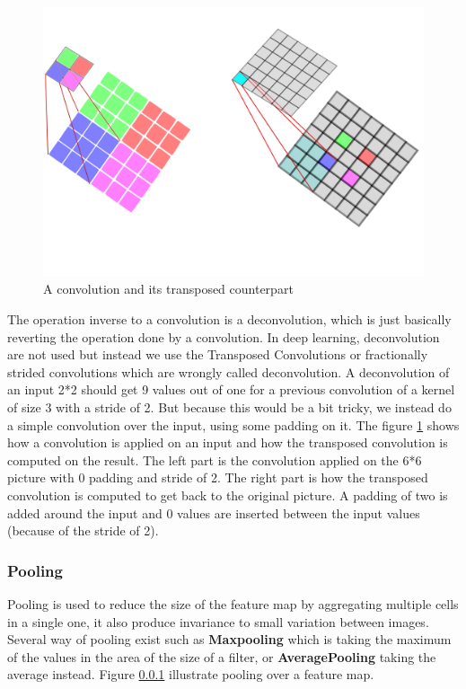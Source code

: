 \begin{figure}[ht!]
   \centerline{\includegraphics[scale=0.30]{./pics/convolution.png}}
   \caption{A convolution and its transposed counterpart}
   \label{fig:conv}
\end{figure}


The operation inverse to a convolution is a deconvolution, which is just basically reverting the operation done by a convolution.
In deep learning, deconvolution are not used but instead we use the Transposed Convolutions or fractionally strided convolutions which are wrongly called deconvolution. A deconvolution of an input 2*2 should get 9 values out of one for a previous convolution of a kernel of size 3 with a stride of 2. But because this would be a bit tricky, we instead do a simple convolution over the input, using some padding on it. The figure \ref{fig:conv} shows how a convolution is applied on an input and how the transposed convolution is computed on the result. The left part is the convolution applied on the 6*6 picture with 0 padding and stride of 2. The right part is how the transposed convolution is computed to get back to the original picture. A padding of two is added around the input and 0 values are inserted between the input values (because of the stride of 2).


\subsubsection{Pooling}

Pooling is used to reduce the size of the feature map by aggregating multiple cells in a single one, it also produce invariance to small variation between images. Several way of pooling exist such  as \textbf{Maxpooling} which is taking the maximum of the values in the area of the size of a filter, or \textbf{AveragePooling} taking the average instead. Figure \ref{}  illustrate pooling over a feature map.


